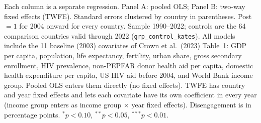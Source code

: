 \begin{table}[htbp]
\par\vspace{4pt}
\begin{minipage}{\textwidth}\footnotesize Each column is a separate regression. Panel A: pooled OLS; Panel B: two-way fixed effects (TWFE). Standard errors clustered by country in parentheses. Post $= 1$ for 2004 onward for every country. Sample 1990--2022; controls are the 64 comparison countries valid through 2022 (\texttt{grp\_control\_kates}). All models include the 11 baseline (2003) covariates of Crown et al.\ (2023) Table~1: GDP per capita, population, life expectancy, fertility, urban share, gross secondary enrollment, HIV prevalence, non-PEPFAR donor health aid per capita, domestic health expenditure per capita, US HIV aid before 2004, and World Bank income group. Pooled OLS enters them directly (no fixed effects). TWFE has country and year fixed effects and lets each covariate have its own coefficient in every year (income group enters as income group $\times$ year fixed effects). Disengagement is in percentage points. $^{*}p<0.10$, $^{**}p<0.05$, $^{***}p<0.01$.\end{minipage}
\end{table}
